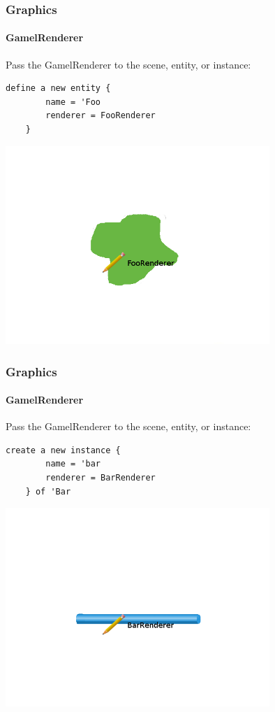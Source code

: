 \documentclass{beamer}
\begin{document}
\begin{frame}[fragile]
    \frametitle{Graphics}
    \framesubtitle{GamelRenderer}
    Pass the GamelRenderer to the scene, entity, or instance:
    \begin{lstlisting}[basicstyle=\small]
    define a new entity {
        name = 'Foo
        renderer = FooRenderer
    }
    \end{lstlisting}
    \includegraphics[width=10cm, trim= 4cm 4cm 4cm 4cm]{Foo-render}
\end{frame}
\begin{frame}[fragile]
    \frametitle{Graphics}
    \framesubtitle{GamelRenderer}
    Pass the GamelRenderer to the scene, entity, or instance:
    \begin{lstlisting}[basicstyle=\small]
    create a new instance {
        name = 'bar
        renderer = BarRenderer
    } of 'Bar
    \end{lstlisting}
    \includegraphics[width=10cm, trim= 4cm 4cm 4cm 4cm]{bar-render}
\end{frame}
\end{document}

